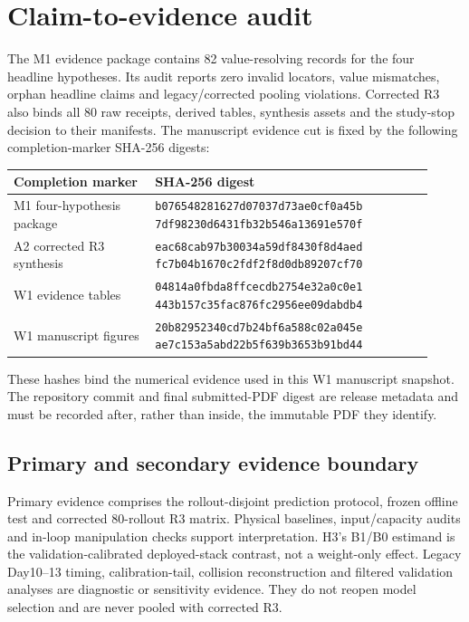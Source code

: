 \section{Claim-to-evidence audit}
\label{app:evidence}

The M1 evidence package contains 82 value-resolving records for the four
headline hypotheses. Its audit reports zero invalid locators, value mismatches,
orphan headline claims and legacy/corrected pooling violations. Corrected R3
also binds all 80 raw receipts, derived tables, synthesis assets and the
study-stop decision to their manifests. The manuscript evidence cut is fixed by
the following completion-marker SHA-256 digests:

\begin{center}
\small
\begin{tabular}{@{}L{0.31\linewidth}L{0.61\linewidth}@{}}
\toprule
Completion marker & SHA-256 digest \\
\midrule
M1 four-hypothesis package &
\texttt{b076548281627d07037d73ae0cf0a45b}\newline
\texttt{7df98230d6431fb32b546a13691e570f} \\
A2 corrected R3 synthesis &
\texttt{eac68cab97b30034a59df8430f8d4aed}\newline
\texttt{fc7b04b1670c2fdf2f8d0db89207cf70} \\
W1 evidence tables &
\texttt{04814a0fbda8ffcecdb2754e32a0c0e1}\newline
\texttt{443b157c35fac876fc2956ee09dabdb4} \\
W1 manuscript figures &
\texttt{20b82952340cd7b24bf6a588c02a045e}\newline
\texttt{ae7c153a5abd22b5f639b3653b91bd44} \\
\bottomrule
\end{tabular}
\end{center}

These hashes bind the numerical evidence used in this W1 manuscript snapshot.
The repository commit and final submitted-PDF digest are release metadata and
must be recorded after, rather than inside, the immutable PDF they identify.

\subsection{Primary and secondary evidence boundary}

Primary evidence comprises the rollout-disjoint prediction protocol, frozen
offline test and corrected 80-rollout R3 matrix. Physical baselines,
input/capacity audits and in-loop manipulation checks support interpretation.
H3's B1/B0 estimand is the validation-calibrated deployed-stack contrast, not
a weight-only effect.
Legacy Day10--13 timing, calibration-tail, collision reconstruction and
filtered validation analyses are diagnostic or sensitivity evidence. They do
not reopen model selection and are never pooled with corrected R3.

